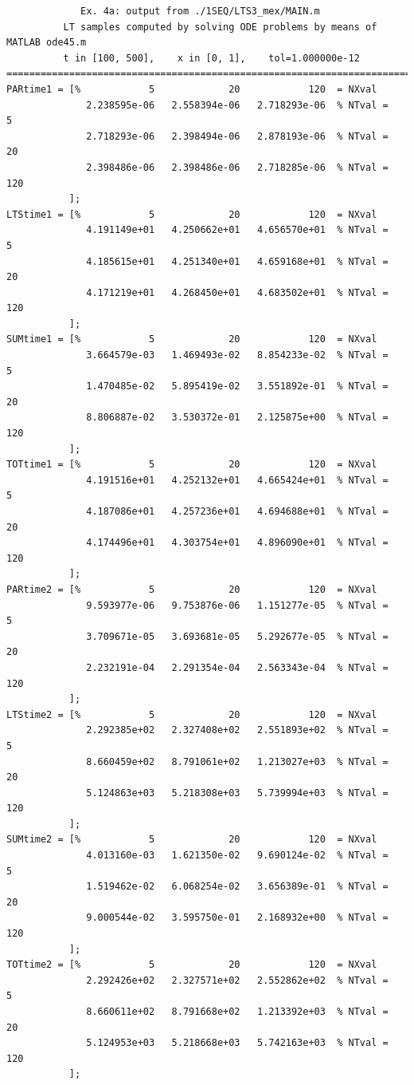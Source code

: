 \documentclass[a4paper,10pt]{report}%
\begin{document}
\begin{lstlisting}
             Ex. 4a: output from ./1SEQ/LTS3_mex/MAIN.m
          LT samples computed by solving ODE problems by means of MATLAB ode45.m
          t in [100, 500],    x in [0, 1],    tol=1.000000e-12
====================================================================================
PARtime1 = [%            5             20            120  = NXval
              2.238595e-06   2.558394e-06   2.718293e-06  % NTval =   5
              2.718293e-06   2.398494e-06   2.878193e-06  % NTval =  20
              2.398486e-06   2.398486e-06   2.718285e-06  % NTval = 120
           ];
LTStime1 = [%            5             20            120  = NXval
              4.191149e+01   4.250662e+01   4.656570e+01  % NTval =   5
              4.185615e+01   4.251340e+01   4.659168e+01  % NTval =  20
              4.171219e+01   4.268450e+01   4.683502e+01  % NTval = 120
           ];
SUMtime1 = [%            5             20            120  = NXval
              3.664579e-03   1.469493e-02   8.854233e-02  % NTval =   5
              1.470485e-02   5.895419e-02   3.551892e-01  % NTval =  20
              8.806887e-02   3.530372e-01   2.125875e+00  % NTval = 120
           ];
TOTtime1 = [%            5             20            120  = NXval
              4.191516e+01   4.252132e+01   4.665424e+01  % NTval =   5
              4.187086e+01   4.257236e+01   4.694688e+01  % NTval =  20
              4.174496e+01   4.303754e+01   4.896090e+01  % NTval = 120
           ];
PARtime2 = [%            5             20            120  = NXval
              9.593977e-06   9.753876e-06   1.151277e-05  % NTval =   5
              3.709671e-05   3.693681e-05   5.292677e-05  % NTval =  20
              2.232191e-04   2.291354e-04   2.563343e-04  % NTval = 120
           ];
LTStime2 = [%            5             20            120  = NXval
              2.292385e+02   2.327408e+02   2.551893e+02  % NTval =   5
              8.660459e+02   8.791061e+02   1.213027e+03  % NTval =  20
              5.124863e+03   5.218308e+03   5.739994e+03  % NTval = 120
           ];
SUMtime2 = [%            5             20            120  = NXval
              4.013160e-03   1.621350e-02   9.690124e-02  % NTval =   5
              1.519462e-02   6.068254e-02   3.656389e-01  % NTval =  20
              9.000544e-02   3.595750e-01   2.168932e+00  % NTval = 120
           ];
TOTtime2 = [%            5             20            120  = NXval
              2.292426e+02   2.327571e+02   2.552862e+02  % NTval =   5
              8.660611e+02   8.791668e+02   1.213392e+03  % NTval =  20
              5.124953e+03   5.218668e+03   5.742163e+03  % NTval = 120
           ];
\end{lstlisting}
\end{document}
